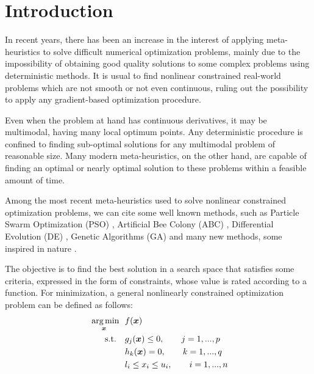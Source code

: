 \section{Introduction} \label{sec:Introduction}

In recent years, there has been an increase in the interest of applying meta-heuristics to solve difficult numerical optimization problems, mainly due to the impossibility of obtaining good quality solutions to some complex problems using deterministic methods. It is usual to find nonlinear constrained real-world problems which are not smooth or not even continuous, ruling out the possibility to apply any gradient-based optimization procedure.

Even when the problem at hand has continuous derivatives, it may be multimodal, having many local optimum points. Any deterministic procedure is confined to finding sub-optimal solutions for any multimodal problem of reasonable size. Many modern meta-heuristics, on the other hand, are capable of finding an optimal or nearly optimal solution to these problems within a feasible amount of time.

Among the most recent meta-heuristics used to solve nonlinear constrained optimization problems, we can cite some well known methods, such as Particle Swarm Optimization (PSO) \citep{IPSO, IAPSO, PSO1}, Artificial Bee Colony (ABC) \citep{CB-ABC, IABC-Mal}, Differential Evolution (DE) \citep{DE1, DE2, MVDE}, Genetic Algorithms (GA) \citep{GA1} and many new methods, some inspired in nature \citep{CS, WCA, MBA}.

The objective is to find the best solution in a search space that satisfies some criteria, expressed in the form of constraints, whose value is rated according to a function. For minimization, a general nonlinearly constrained optimization problem can be defined as follows: \\[-3em]

\begin{equation}\label{eq:func}
    \begin{aligned}
    \underset{\bm{x}}{\text{\fnt{10} arg\,min}} \ \ & f(\bm{x}) \\
    \text{s.t.} \quad & g_j(\bm{x}) \leq 0, \qquad j = 1, ..., p  \\
                      & h_k(\bm{x}) = 0, \qquad k = 1, ..., q  \\
                      & l_i \leq x_i \leq u_i, \qquad i = 1, ..., n 
    \end{aligned}
\end{equation}


